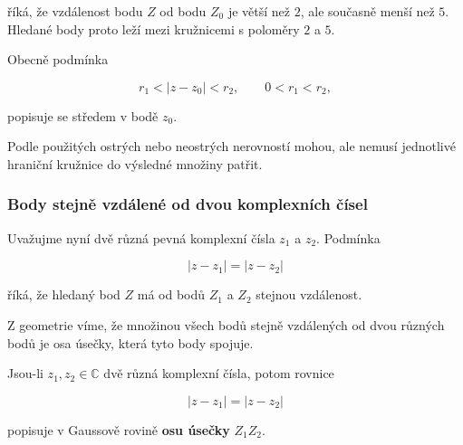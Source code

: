 \documentclass[12pt,a4paper]{article}
\begin{document}
říká, že vzdálenost bodu $Z$ od bodu $Z_0$ je větší než $2$, ale současně menší
než $5$. Hledané body proto leží mezi kružnicemi s poloměry $2$ a $5$.

Obecně podmínka

\[
    r_1<|z-z_0|<r_2,
    \qquad
    0<r_1<r_2,
\]

popisuje  se středem v bodě $z_0$.

Podle použitých ostrých nebo neostrých nerovností mohou, ale nemusí jednotlivé
hraniční kružnice do výsledné množiny patřit.


\subsubsection*{Body stejně vzdálené od dvou komplexních čísel}

Uvažujme nyní dvě různá pevná komplexní čísla $z_1$ a $z_2$. Podmínka

\[
    |z-z_1|=|z-z_2|
\]

říká, že hledaný bod $Z$ má od bodů $Z_1$ a $Z_2$ stejnou vzdálenost.

Z geometrie víme, že množinou všech bodů stejně vzdálených od dvou různých bodů
je osa úsečky, která tyto body spojuje.

\begin{definitionbox}

Jsou-li $z_1,z_2\in\mathbb{C}$ dvě různá komplexní čísla, potom rovnice

\[
    |z-z_1|=|z-z_2|
\]

popisuje v Gaussově rovině \textbf{osu úsečky} $Z_1Z_2$.

\end{definitionbox}
\end{document}
